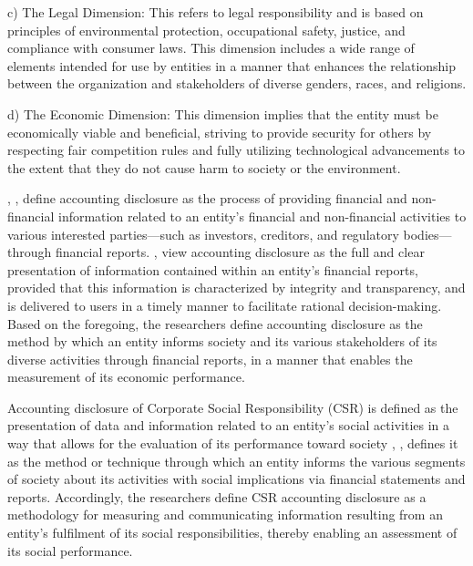 \documentclass[10pt]{NSP1}
\begin{document}
c) The Legal Dimension: This refers to legal responsibility and is based on principles of environmental protection, occupational safety, justice, and compliance with consumer laws. This dimension includes a wide range of elements intended for use by entities in a manner that enhances the relationship between the organization and stakeholders of diverse genders, races, and religions.

d) The Economic Dimension: This dimension implies that the entity must be economically viable and beneficial, striving to provide security for others by respecting fair competition rules and fully utilizing technological advancements to the extent that they do not cause harm to society or the environment.

\par\medskip{}\smallskip

\cite{ref36} , \cite{ref30}, define accounting disclosure as the process of providing financial and non-financial information related to an entity's financial and non-financial activities to various interested parties—such as investors, creditors, and regulatory bodies—through financial reports. \cite{ref9}, view accounting disclosure as the full and clear presentation of information contained within an entity's financial reports, provided that this information is characterized by integrity and transparency, and is delivered to users in a timely manner to facilitate rational decision-making. Based on the foregoing, the researchers define accounting disclosure as the method by which an entity informs society and its various stakeholders of its diverse activities through financial reports, in a manner that enables the measurement of its economic performance.

Accounting disclosure of Corporate Social Responsibility (CSR) is defined as the presentation of data and information related to an entity's social activities in a way that allows for the evaluation of its performance toward society \cite{ref21}, \cite{ref22}, defines it as the method or technique through which an entity informs the various segments of society about its activities with social implications via financial statements and reports. Accordingly, the researchers define CSR accounting disclosure as a methodology for measuring and communicating information resulting from an entity’s fulfilment of its social responsibilities, thereby enabling an assessment of its social performance.
\end{document}
